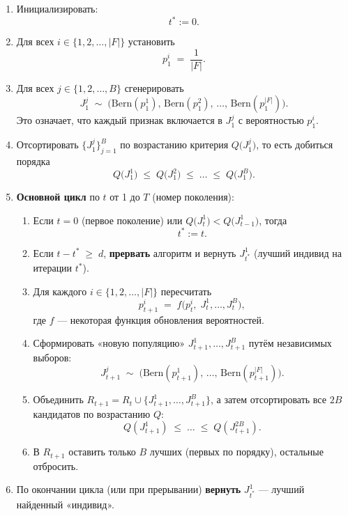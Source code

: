 \begin{enumerate}
    \item Инициализировать:
          \[
              t^* := 0.
          \]

    \item Для всех $i \in \{1, 2, \ldots, |F|\}$ установить
          \[
              p_1^i \;=\; \frac{1}{|F|}.
          \]

    \item Для всех $j \in \{1, 2, \ldots, B\}$ сгенерировать
          \[
              J_1^j \;\sim\; \bigl(\mathrm{Bern}(p_1^1),\,\mathrm{Bern}(p_1^2),\,\dots,\,\mathrm{Bern}(p_1^{|F|})\bigr).
          \]
          Это означает, что каждый признак включается в $J_1^j$ с вероятностью $p_1^i$.

    \item Отсортировать $\{J_1^j\}_{j=1}^B$ по возрастанию критерия $Q\bigl(J_1^j\bigr)$, то есть добиться порядка
          \[
              Q\bigl(J_1^1\bigr) \;\le\; Q\bigl(J_1^2\bigr) \;\le\; \dots \;\le\; Q\bigl(J_1^B\bigr).
          \]

    \item \textbf{Основной цикл} по $t$ от 1 до $T$ (номер поколения):
          \begin{enumerate}
              \item Если $t=0$ (первое поколение) или $Q\bigl(J_t^1\bigr) < Q\bigl(J_{t-1}^1\bigr)$, тогда
                    \[
                        t^* := t.
                    \]
              \item Если $t - t^* \;\ge\; d$, \textbf{прервать} алгоритм и вернуть $J_{t^*}^1$ (лучший индивид на итерации $t^*$).
              \item Для каждого $i \in \{1, 2, \ldots, |F|\}$ пересчитать
                    \[
                        p_{t+1}^i \;=\; f\bigl(p_t^i,\; J_t^1,\dots, J_t^B\bigr),
                    \]
                    где $f$ — некоторая функция обновления вероятностей.
              \item Сформировать «новую популяцию» $J_{t+1}^1,\dots,J_{t+1}^B$ путём независимых выборов:
                    \[
                        J_{t+1}^j \;\sim\;
                        \bigl(\mathrm{Bern}(p_{t+1}^1),\,\ldots,\,
                        \mathrm{Bern}(p_{t+1}^{|F|})\bigr).
                    \]
              \item Объединить $R_{t+1} = R_t \cup \{J_{t+1}^1,\dots,J_{t+1}^B\}$, а затем отсортировать все $2B$ кандидатов по возрастанию $Q$:
                    \[
                        Q(J_{t+1}^1) \;\le\;\ldots\;\le\; Q(J_{t+1}^{2B}).
                    \]
              \item В $R_{t+1}$ оставить только $B$ лучших (первых по порядку), остальные отбросить.
          \end{enumerate}

    \item По окончании цикла (или при прерывании) \textbf{вернуть} $J_{t^*}^1$ — лучший найденный «индивид».
\end{enumerate}


